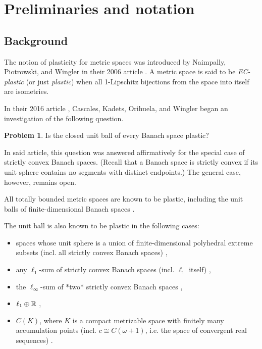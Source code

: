 \documentclass{amsart}
\theoremstyle{definition}
\newtheorem*{prob*}{Problem}
\begin{document}
\section{Preliminaries and notation}

\subsection{Background}

The notion of plasticity for metric spaces was introduced by Naimpally, Piotrowski, and Wingler in their 2006 article \cite{naimpally:2006}.
A metric space is said to be \textit{EC-plastic} (or just \textit{plastic}) when
all 1-Lipschitz bijections from the space into itself are isometries.

In their 2016 article \cite{cascales:2016}, Cascales, Kadets, Orihuela, and Wingler began an investigation
of the following question.

\begin{prob*}
    Is the closed unit ball of every Banach space plastic?
\end{prob*}

In said article, this question was answered affirmatively for the special case of strictly convex Banach spaces. (Recall that a Banach
space is strictly convex if its
unit sphere contains no segments with distinct
endpoints.) The general case, however, remains open.

All totally bounded metric spaces are known to be plastic, including the unit balls of finite-dimensional Banach spaces \cite{naimpally:2006}.

The unit ball is also known to be plastic
in the following cases:
\begin{itemize}
    \item spaces whose unit sphere is a union of finite-dimensional polyhedral extreme subsets (incl. all strictly convex Banach spaces) \cite{angosto:2019,cascales:2016},
    \item any $\ell_1$-sum of strictly convex Banach spaces 
    (incl. $\ell_1$ itself) \cite{kadets_zavarzina:2016,kadets_zavarzina:2018},
    \item the $\ell_\infty$-sum of *two* strictly convex Banach spaces \cite{haller:2022},
    \item $\ell_1 \oplus \mathbb{R}$ \cite{haller:2022},
    \item $C(K)$, where $K$ is a compact metrizable space with finitely many
    accumulation points (incl. $c \cong C(\omega+1)$, i.e. the space of convergent real sequences)
    \cite{fakhoury:2024,leo:2022}.
\end{itemize}
\end{document}
